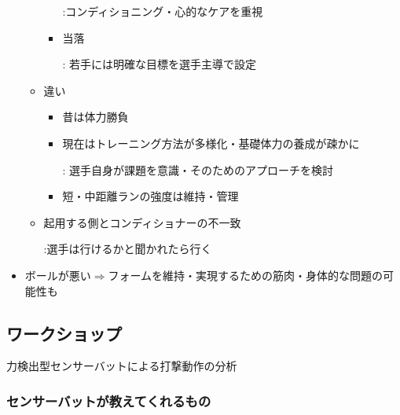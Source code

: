 \documentclass[dvipdfmx, 10.5pt]{jsarticle}
\begin{document}
\begin{itemize}
\begin{itemize}
\begin{itemize}
      :コンディショニング・心的なケアを重視

      \item 当落

      : 若手には明確な目標を選手主導で設定

    \end{itemize}

    \item 違い

    \begin{itemize}
      \item 昔は体力勝負

      \item 現在はトレーニング方法が多様化・基礎体力の養成が疎かに

      : 選手自身が課題を意識・そのためのアプローチを検討

      \item 短・中距離ランの強度は維持・管理
    \end{itemize}

    \item 起用する側とコンディショナーの不一致

    :選手は行けるかと聞かれたら行く

  \end{itemize}

  \item ボールが悪い$\Rightarrow$フォームを維持・実現するための筋肉・身体的な問題の可能性も
\end{itemize}

\subsection{ワークショップ}

力検出型センサーバットによる打撃動作の分析

\subsubsection{センサーバットが教えてくれるもの}
\end{document}
